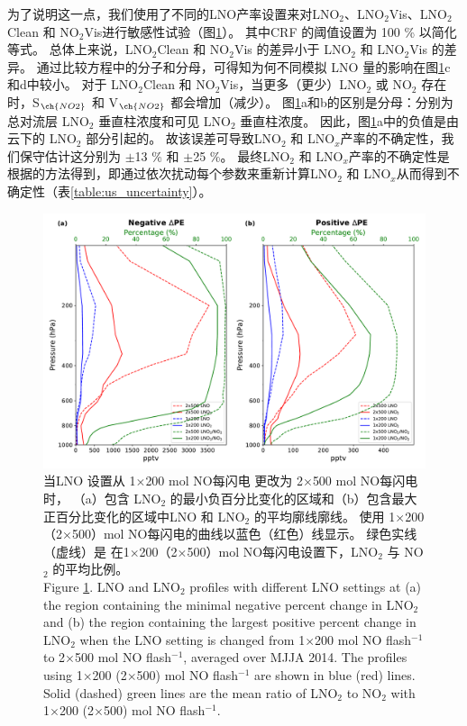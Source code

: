 为了说明这一点，我们使用了不同的LNO产率设置来对LNO$_2$、LNO$_2$Vis、LNO$_2$Clean 和 NO$_2$Vis进行敏感性试验（图\ref{fig:us_lno2_profile}）。
其中CRF 的阈值设置为 100 \% 以简化等式。
总体上来说，LNO$_2$Clean 和 NO$_2$Vis 的差异小于 LNO$_2$ 和 LNO$_2$Vis 的差异。
通过比较方程中的分子和分母，可得知为何不同模拟 LNO 量的影响在图\ref{fig:us_lno2_profile}c和d中较小。
对于 LNO$_2$Clean 和 NO$_2$Vis，当更多（更少）LNO$_2$ 或 NO$_2$ 存在时，S$_{\ch{NO2}}$ 和 V$_{\ch{NO2}}$ 都会增加（减少）。
图\ref{fig:us_lno2_profile}a和b的区别是分母：分别为总对流层 LNO$_2$ 垂直柱浓度和可见 LNO$_2$ 垂直柱浓度。
因此，图\ref{fig:us_lno2_profile}a中的负值是由云下的 LNO$_2$ 部分引起的。
故该误差可导致LNO$_2$ 和 LNO$_x$产率的不确定性，我们保守估计这分别为 $\pm$13 \% 和 $\pm$25 \%。
最终LNO$_2$ 和 LNO$_x$产率的不确定性是根据\citet{Pickering.2016,Allen.2019,Bucsela.2019,Lapierre.2020}的方法得到，即通过依次扰动每个参数来重新计算LNO$_2$ 和 LNO$_x$从而得到不确定性（表\ref{table:us_uncertainty}）。


\begin{figure}[!htbp]
\centering
\includegraphics[width=13cm]{./figures/us_lno2_profile.pdf}
\caption{当LNO 设置从 1$\times$200 mol NO每闪电 更改为 2$\times$500 mol NO每闪电 时，
（a）包含 LNO$_2$ 的最小负百分比变化的区域和（b）包含最大正百分比变化的区域中LNO 和 LNO$_2$ 的平均廓线廓线。
使用 1$\times$200（2$\times$500）mol NO每闪电的曲线以蓝色（红色）线显示。
绿色实线（虚线）是 在1$\times$200（2$\times$500）mol NO每闪电设置下，LNO$_2$ 与 NO$_2$ 的平均比例。\\
Figure \ref{fig:us_lno2_profile}. LNO and LNO$_2$ profiles with different LNO settings at (a) the region containing the minimal negative percent change in LNO$_2$ and (b) the region containing the largest positive percent change in LNO$_2$ when the LNO setting is changed from 1$\times$200 mol NO flash$^{-1}$ to 2$\times$500 mol NO flash$^{-1}$, averaged over MJJA 2014.
The profiles using 1$\times$200 (2$\times$500) mol NO flash$^{-1}$ are shown in blue (red) lines.
Solid (dashed) green lines are the mean ratio of LNO$_2$ to NO$_2$ with 1$\times$200 (2$\times$500) mol NO flash$^{-1}$.}
\label{fig:us_lno2_profile}
\end{figure}


